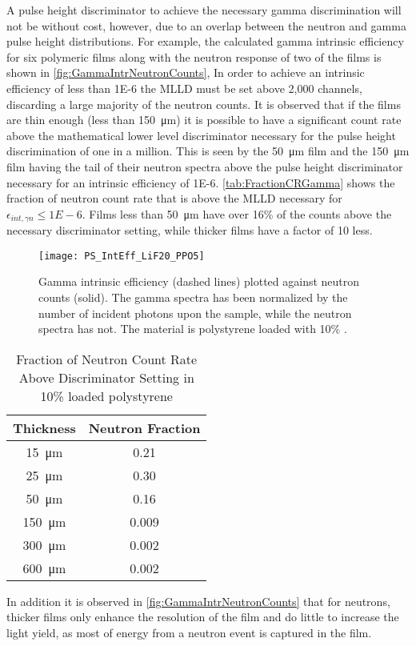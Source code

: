 A pulse height discriminator to achieve the necessary gamma discrimination will not be without cost, however, due to an overlap between the neutron and gamma pulse height distributions.
For example, the calculated gamma intrinsic efficiency for six polymeric films along with the neutron response of two of the films is shown in \autoref{fig:GammaIntrNeutronCounts},
In order to achieve an intrinsic efficiency of less than \num{1E-6} the MLLD must be set above 2,000 channels, discarding a large majority of the neutron counts.
It is observed that if the films are thin enough (less than \SI{150}{\um}) it is possible to have a significant count rate above the mathematical lower level discriminator necessary for the pulse height discrimination of one in a million.
This is seen by the \SI{50}{\um} film and the \SI{150}{\um} film having the tail of their neutron spectra above the pulse height discriminator necessary for an intrinsic efficiency of \num{1E-6}.
\autoref{tab:FractionCRGamma} shows the fraction of neutron count rate that is above the MLLD necessary for $\epsilon_{int,\gamma n} \le \si{1E-6}$.
Films less than \SI{50}{\um} have over 16\% of the counts above the necessary discriminator setting, while thicker films have a factor of 10 less.
\begin{figure}[ht]
    \centering
    \texttt{[image: PS\_IntEff\_LiF20\_PPO5]}
    \caption[PS Gamma intrinsic efficiency and neutron count rate]{Gamma intrinsic efficiency (dashed lines) plotted against neutron counts (solid). The gamma spectra has been normalized by the number of incident photons upon the sample, while the neutron spectra has not. The material is polystyrene loaded with 10\% .}
    \label{fig:GammaIntrNeutronCounts}
\end{figure}
\begin{table}
    \caption{Fraction of Neutron Count Rate Above Discriminator Setting in 10\% loaded polystyrene}
	\centering
	\begin{tabular}{c | c}
  \toprule
	Thickness & Neutron Fraction \\
	\midrule
  \SI{15}{\um} & 0.21 \\
	\SI{25}{\um} & 0.30 \\
	\SI{50}{\um}  & 0.16 \\
	\SI{150}{\um}  & 0.009 \\
	\SI{300}{\um}  & 0.002 \\
	\SI{600}{\um}  & 0.002 \\
  \bottomrule
	\end{tabular}
  \label{tab:FractionCRGamma}
\end{table}
In addition it is observed in \autoref{fig:GammaIntrNeutronCounts} that for neutrons, thicker films only enhance the resolution of the film and do little to increase the light yield, as most of energy from a neutron event is captured in the film.
